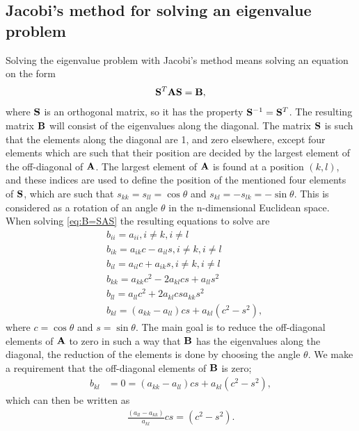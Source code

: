 \documentclass{emulateapj}
\begin{document}
\subsection{Jacobi's method for solving an eigenvalue problem}
Solving the eigenvalue problem with Jacobi's method means solving an equation on the form
%
\begin{gather}\label{eq:B=SAS}
    \bold{S}^T\bold{A}\bold{S} = \bold{B},
\end{gather}
%
where $\bold{S}$ is an orthogonal matrix, so it has the property $\bold{S}^{-1} = \bold{S}^T$. The resulting matrix $\bold{B}$ will consist of the eigenvalues along the diagonal. The matrix $\bold{S}$ is such that the elements along the diagonal are 1, and zero elsewhere, except four elements which are such that their position are decided by the largest element of the off-diagonal of $\bold{A}$. The largest element of $\bold{A}$ is found at a position $(k,l)$, and these indices are used to define the position of the mentioned four elements of $\bold{S}$, which are such that $s_{kk} = s_{ll} = \cos\theta$ and $s_{kl} = -s_{lk} = -\sin\theta$. This is considered as a rotation of an angle $\theta$ in the n-dimensional Euclidean space. When solving \eqref{eq:B=SAS} the resulting equations to solve are
%
\begin{align*}
    &b_{ii} = a_{ii}, i \neq k, i \neq l \\
    &b_{ik} = a_{ik}c - a_{il}s, i\neq k, i\neq l \\
    &b_{il} = a_{il}c + a_{ik}s, i \neq k, i\neq l \\
    &b_{kk} = a_{kk} c^2 - 2a_{kl}cs+ a_{ll}s^2 \\
    &b_{ll} = a_{ll} c^2 + 2a_{kl}cs a_{kk}s^2 \\
    &b_{kl} = \left(a_{kk} - a_{ll}\right)cs + a_{kl}\left(c^2 - s^2\right),
\end{align*}
where $c = \cos\theta$ and $s = \sin\theta$. The main goal is to reduce the off-diagonal elements of $\bold{A}$ to zero in such a way that $\bold{B}$ has the eigenvalues along the diagonal, the reduction of the elements is done by choosing the angle $\theta$. We make a requirement that the off-diagonal elements of $\bold{B}$ is zero;
%
\begin{align*}
    b_{kl} &= 0 = \left(a_{kk} - a_{ll}\right)cs + a_{kl} \left(c^2 - s^2\right),
\end{align*}
%
which can then be written as
%
\begin{gather*}
    \frac{\left(a_{ll} - a_{kk}\right)}{a_{kl}}cs = \left(c^2 - s^2\right).
\end{gather*}
\end{document}
